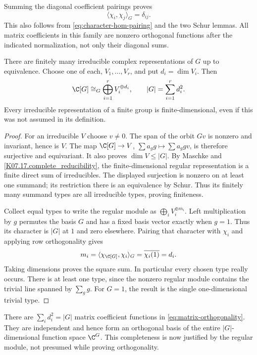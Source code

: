 Summing the diagonal coefficient pairings proves
\begin{equation}\label{eq:character-row-orthogonality}
 \langle\chi_i,\chi_j\rangle_G=\delta_{ij}.
\end{equation}
This also follows from \eqref{eq:character-hom-pairing} and the two
Schur lemmas. All matrix coefficients in this family are nonzero
orthogonal functions after the indicated normalization, not only their
diagonal sums.

\begin{theorem}\label{thm:regular-complex-decomposition}
There are finitely many irreducible complex representations of $G$ up
to equivalence. Choose one of each, $V_1,\ldots,V_r$, and put
$d_i=\dim V_i$. Then
\[
 \C[G]\cong_G\bigoplus_{i=1}^r V_i^{\oplus d_i},
 \qquad |G|=\sum_{i=1}^r d_i^2.
\]
Every irreducible representation of a finite group is finite-dimensional,
even if this was not assumed in its definition.
\end{theorem}
\begin{proof}
For an irreducible $V$ choose $v\ne0$. The span of the orbit $Gv$
is nonzero and invariant, hence is $V$. The map
$\C[G]\to V$, $\sum a_gg\mapsto\sum a_g gv$, is therefore
surjective and equivariant. It also proves $\dim V\leq |G|$.
By Maschke and \ref{K07.17.complete_reducibility}, the finite-dimensional
regular representation is a finite direct sum of irreducibles.
The displayed surjection is nonzero on at least one summand; its
restriction there is an equivalence by Schur. Thus its finitely many
summand types are all irreducible types, proving finiteness.

Collect equal types to write the regular module as
$\bigoplus_i V_i^{\oplus m_i}$. Left multiplication by $g$ permutes
the basis $G$ and has a fixed basis vector exactly when $g=1$.
Thus its character is $|G|$ at $1$ and zero elsewhere. Pairing that
character with $\chi_i$ and applying row orthogonality gives
\[
 m_i=\langle\chi_{\C[G]},\chi_i\rangle_G
 =\overline{\chi_i(1)}=d_i.
\]
Taking dimensions proves the square sum. In particular every chosen
type really occurs. There is at least one type, since the nonzero
regular module contains the trivial line spanned by $\sum_g g$.
For $G=1$, the result is the single one-dimensional trivial type.
\end{proof}
There are $\sum_i d_i^2=|G|$ matrix coefficient functions in
\eqref{eq:matrix-orthogonality}. They are independent and hence form
an orthogonal basis of the entire $|G|$-dimensional function space
$\C^G$. This completeness is now justified by the regular module,
not presumed while proving orthogonality.

